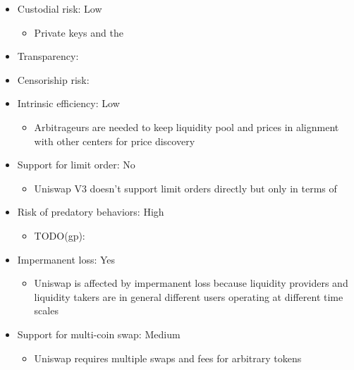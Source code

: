 \documentclass[11pt, reqno]{amsart}
\theoremstyle{definition}
\theoremstyle{remark}
\begin{document}
\begin{itemize}
	\item Custodial risk: Low
	      \begin{itemize}
		      \item Private keys and the
	      \end{itemize}
	\item Transparency:
	\item Censoriship risk:
	\item Intrinsic efficiency: Low
	      \begin{itemize}
		      \item Arbitrageurs are needed to keep liquidity pool and prices in alignment with other centers for price discovery
	      \end{itemize}
	\item Support for limit order: No
	      \begin{itemize}
		      \item Uniswap V3 doesn't support limit orders directly but only in terms of
	      \end{itemize}
	\item Risk of predatory behaviors: High
	      \begin{itemize}
		      \item TODO(gp):
	      \end{itemize}
	\item Impermanent loss: Yes
	      \begin{itemize}
		      \item Uniswap is affected by impermanent loss because liquidity providers and liquidity takers are in general different users operating at different time scales
	      \end{itemize}
	\item Support for multi-coin swap: Medium
	      \begin{itemize}
		      \item Uniswap requires multiple swaps and fees for arbitrary tokens
	      \end{itemize}
\end{itemize}




\end{document}

